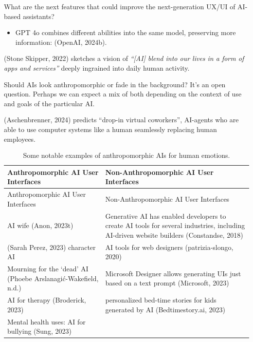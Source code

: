 \documentclass[
  letterpaper,
  DIV=11,
  numbers=noendperiod]{scrartcl}
\providecommand{\tightlist}{%
  \setlength{\itemsep}{0pt}\setlength{\parskip}{0pt}}\usepackage{longtable,booktabs,array}
\begin{document}
What are the next features that could improve the next-generation UX/UI
of AI-based assistants?

\begin{itemize}
\tightlist
\item
  GPT 4o combines different abilities into the same model, preserving
  more information: (OpenAI, 2024b).
\end{itemize}

(Stone Skipper, 2022) sketches a vision of \emph{``{[}AI{]} blend into
our lives in a form of apps and services''} deeply ingrained into daily
human activity.

Should AIs look anthropomorphic or fade in the background? It's an open
question. Perhaps we can expect a mix of both depending on the context
of use and goals of the particular AI.

(Aschenbrenner, 2024) predicts ``drop-in virtual coworkers'', AI-agents
who are able to use computer systems like a human seamlessly replacing
human employees.

\begin{longtable}[]{@{}
  >{\raggedright\arraybackslash}p{}
  >{\raggedright\arraybackslash}p{}@{}}
\caption{Some notable examples of anthropomorphic AIs for human
emotions.}\tabularnewline
\toprule\noalign{}
\begin{minipage}[b]{\linewidth}\raggedright
Anthropomorphic AI User Interfaces
\end{minipage} & \begin{minipage}[b]{\linewidth}\raggedright
Non-Anthropomorphic AI User Interfaces
\end{minipage} \\
\midrule\noalign{}
\endfirsthead
\toprule\noalign{}
\begin{minipage}[b]{\linewidth}\raggedright
Anthropomorphic AI User Interfaces
\end{minipage} & \begin{minipage}[b]{\linewidth}\raggedright
Non-Anthropomorphic AI User Interfaces
\end{minipage} \\
\midrule\noalign{}
\endhead
\bottomrule\noalign{}
\endlastfoot
AI wife (Anon, 2023t) & Generative AI has enabled developers to create
AI tools for several industries, including AI-driven website builders
(Constandse, 2018) \\
(Sarah Perez, 2023) character AI & AI tools for web designers
(patrizia-slongo, 2020) \\
Mourning for the `dead' AI (Phoebe Arslanagić-Wakefield, n.d.) &
Microsoft Designer allows generating UIs just based on a text prompt
(Microsoft, 2023) \\
AI for therapy (Broderick, 2023) & personalized bed-time stories for
kids generated by AI (Bedtimestory.ai, 2023) \\
Mental health uses: AI for bullying (Sung, 2023) & \\
\end{longtable}
\end{document}

